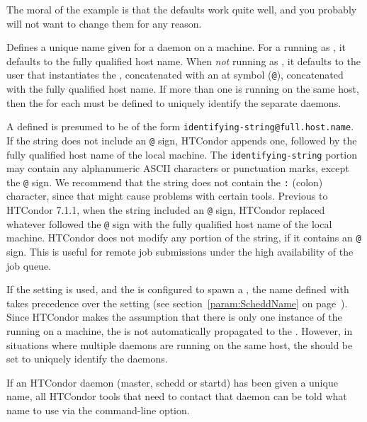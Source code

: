 The moral of the example is that 
the defaults work quite well, and you probably 
will not want to change them for any reason.
\begin{description}

\label{param:MasterName}
\item[\Macro{MASTER\_NAME}]
  Defines a unique name given for a  daemon on a machine.
  For a  running as ,
  it defaults to the fully qualified host name.
  When \emph{not} running as ,
  it defaults to the user that instantiates the
  , concatenated with an at symbol (\verb$@$),
  concatenated with the fully qualified host name.
  If more than one  is running on the same host, 
  then the  for each
   must be defined to uniquely identify the separate
  daemons. 

  A defined  is presumed to be of the form
  \verb$identifying-string@full.host.name$.
  If the string does not include an \verb$@$ sign,
  HTCondor appends one, followed by the fully qualified host name
  of the local machine.
  The \verb$identifying-string$ portion may contain any
  alphanumeric ASCII characters or punctuation marks, except the \verb$@$ sign.
  We recommend that the string does not contain the \verb$:$ (colon)
  character, since that might cause problems with certain tools.
  Previous to HTCondor 7.1.1, when the string included
  an \verb$@$ sign, HTCondor replaced whatever followed the \verb$@$
  sign with the fully qualified host name of the local machine.
  HTCondor does not modify any portion of the string, if it
  contains an \verb$@$ sign.
  This is useful for remote job submissions under the high availability
  of the job queue.

  If the  setting is used, and the
   is configured to spawn a ,
  the name
  defined with  takes precedence over the
   setting (see section~\ref{param:ScheddName} on
  page~\pageref{param:ScheddName}). 
  Since HTCondor makes the assumption that there is only one
  instance of the  running on a machine,
  the  is not automatically propagated to the
  .
  However, in situations where multiple  daemons are
  running on the same host,
  the  should be set to uniquely identify 
  the  daemons.

  If an HTCondor daemon (master, schedd or startd) has been given a
  unique name, all HTCondor tools that need to contact that daemon can
  be told what name to use via the  command-line option.



\end{description}
